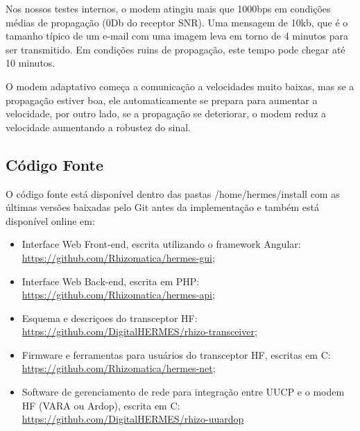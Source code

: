 \documentclass[11pt,a4paper]{article}
\begin{document}
Nos nossos testes internos, o modem atingiu mais que 1000bps em condições médias de propagação (0Db do receptor SNR). Uma mensagem de 10kb, que é o tamanho típico de um e-mail com uma imagem leva em torno de 4 minutos para ser transmitido. Em condições ruins de propagação, este tempo pode chegar até 10 minutos.


O modem adaptativo começa a comunicação a velocidades muito baixas, mas se a propagação estiver boa, ele automaticamente se prepara para aumentar a velocidade, por outro lado, se a propagação se deteriorar, o modem reduz a velocidade aumentando a robustez do sinal. 
    
    

\subsection{Código Fonte}
\label{apx_src}

O código fonte está disponível dentro das pastas /home/hermes/install com as últimas versões baixadas pelo Git antes da implementação e também está disponível online em: 


\begin{itemize}
    \item Interface Web Front-end, escrita utilizando o framework Angular: \url{https://github.com/Rhizomatica/hermes-gui};
    \item Interface Web Back-end, escrita em PHP: \url{https://github.com/Rhizomatica/hermes-api}; 
    \item Esquema e descriçoes do transceptor HF: \url{https://github.com/DigitalHERMES/rhizo-transceiver};    
    \item Firmware e ferramentas para usuários do transceptor HF, escritas em C:
    \url{https://github.com/Rhizomatica/hermes-net};
    \item Software de gerenciamento de rede para integração entre UUCP e o modem HF (VARA ou Ardop), escrita em C:
    \url{https://github.com/DigitalHERMES/rhizo-uuardop}
\end{itemize}
\end{document}
